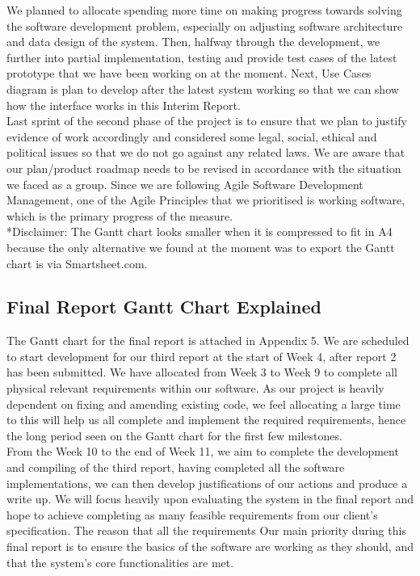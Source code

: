 	We planned to allocate spending more time on making progress towards solving the software development problem, especially on adjusting software architecture and data design of the system. Then, halfway through the development, we further into partial implementation, testing and provide test cases of the latest prototype that we have been working on at the moment. Next, Use Cases diagram is plan to develop after the latest system working so that we can show how the interface works in this Interim Report.\\
	
Last sprint of the second phase of the project is to ensure that we plan to justify evidence of work accordingly and considered some legal, social, ethical and political issues so that we do not go against any related laws. We are aware that our plan/product roadmap needs to be revised in accordance with the  situation we faced as a group.  Since we are following Agile Software Development Management, one of the Agile Principles that we prioritised is working software, which is the primary progress of the measure.\\

*Disclaimer: The Gantt chart looks smaller when it is compressed to fit in A4 because the only alternative we found at the moment was to export the Gantt chart is via Smartsheet.com.

\subsection*{Final Report Gantt Chart Explained}

The Gantt chart for the final report is attached in Appendix 5. We are scheduled to start development for our third report at the start of Week 4, after report 2 has been submitted. We have allocated from Week 3 to Week 9  to complete all physical relevant requirements within our software. As our project is heavily dependent on fixing and amending existing code, we feel allocating a large time to this will help us all complete and implement the required requirements, hence the long period seen on the Gantt chart for the first few milestones.\\

From the Week 10 to the end of Week 11, we aim to complete the development and compiling of the third report, having completed all the software implementations, we can then develop justifications of our actions and produce a write up. We will focus heavily upon evaluating the system in the final report and hope to achieve completing as many feasible requirements from our client’s specification. The reason that all the requirements Our main priority during this final report is to ensure the basics of the software are working as they should, and that the system’s core functionalities are met.\\


